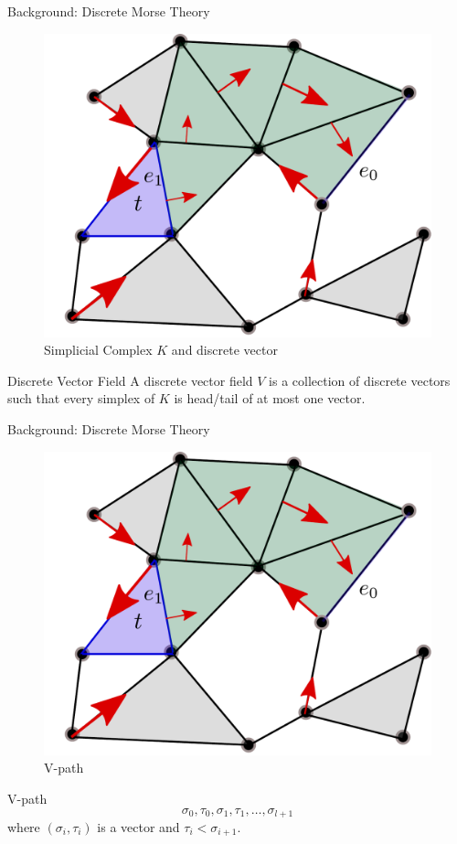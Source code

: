 \documentclass[9pt,sans-serif]{beamer}
\begin{document}
\begin{frame}{Background: Discrete Morse Theory}
 \begin{figure}[htb]
    \centering \includegraphics[scale=0.3]{vpath}
    \caption{Simplicial Complex $K$ and discrete vector}
  \end{figure}

 \begin{block}{Discrete Vector Field}
 A discrete vector field $V$ is a collection of discrete vectors such that every
 simplex of $K$ is head/tail of at most one vector.
 \end{block}
\end{frame}


\begin{frame}{Background: Discrete Morse Theory}
 \begin{figure}[htb]
    \centering \includegraphics[scale=0.3]{vpath}
    \caption{V-path}
  \end{figure}

 \begin{block}{V-path}
   $$\sigma_0,\tau_0,\sigma_1,\tau_1,\ldots,\sigma_{l+1}$$
   where $(\sigma_i,\tau_i)$ is a vector and $\tau_i<\sigma_{i+1}$.
 \end{block}
\end{frame}
\end{document}
